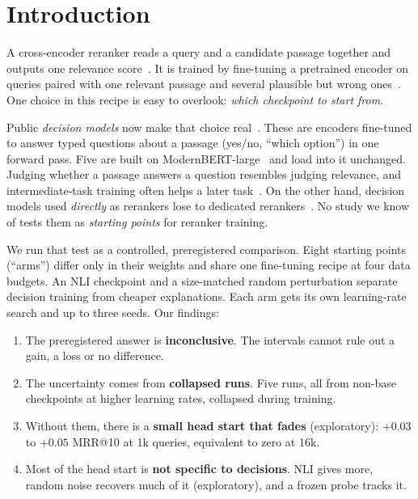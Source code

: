 \documentclass[conference]{IEEEtran}
\makeatletter
\newcommand{\ms}{MRR@10}
\makeatother
\begin{document}
\section{Introduction}

A cross-encoder reranker reads a query and a candidate passage together and outputs one relevance score~\cite{nogueira2019passage,lin2021survey}. It is trained by fine-tuning a pretrained encoder on queries paired with one relevant passage and several plausible but wrong ones~\cite{gao2021rethink}. One choice in this recipe is easy to overlook: \emph{which checkpoint to start from}.

Public \emph{decision models} now make that choice real~\cite{rastogi2026smallheads,dinzinger2026systemone}. These are encoders fine-tuned to answer typed questions about a passage (yes/no, ``which option'') in one forward pass. Five are built on ModernBERT-large~\cite{warner2024modernbert} and load into it unchanged. Judging whether a passage answers a question resembles judging relevance, and intermediate-task training often helps a later task~\cite{phang2018stilts,pruksachatkun2020intermediate,garg2020tanda}. On the other hand, decision models used \emph{directly} as rerankers lose to dedicated rerankers~\cite{dinzinger2026systemone,li2026replace}. No study we know of tests them as \emph{starting points} for reranker training.

We run that test as a controlled, preregistered comparison. Eight starting points (``arms'') differ only in their weights and share one fine-tuning recipe at four data budgets. An NLI checkpoint and a size-matched random perturbation separate decision training from cheaper explanations. Each arm gets its own learning-rate search and up to three seeds. Our findings:
\begin{enumerate}
\item The preregistered answer is \textbf{inconclusive}. The intervals cannot rule out a gain, a loss or no difference.
\item The uncertainty comes from \textbf{collapsed runs}. Five runs, all from non-base checkpoints at higher learning rates, collapsed during training.
\item Without them, there is a \textbf{small head start that fades} (exploratory): $+0.03$ to $+0.05$ \ms{} at 1k queries, equivalent to zero at 16k.
\item Most of the head start is \textbf{not specific to decisions}. NLI gives more, random noise recovers much of it (exploratory), and a frozen probe tracks it.
\end{enumerate}
\end{document}
